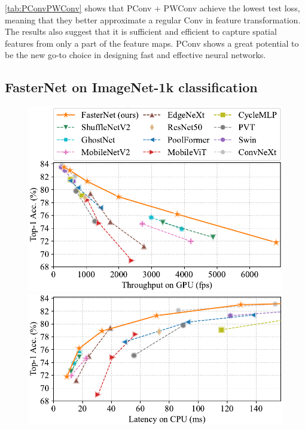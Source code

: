 \cref{tab:PConvPWConv} shows that PConv + PWConv achieve the lowest test loss, meaning that they better approximate a regular Conv in feature transformation. The results also suggest that it is sufficient and efficient to capture spatial features from only a part of the feature maps. PConv shows a great potential to be the new go-to choice in designing fast and effective neural networks.




\subsection{FasterNet on ImageNet-1k classification}

\begin{figure}
    \centering
    \vspace{-0.05in}
    \includegraphics[width=1\linewidth]{figures/fps_latency_gpu_st-cropped.pdf}
    
    \includegraphics[width=1\linewidth]{figures/acc_latency_cpu_st-cropped.pdf}
    

\end{figure}
